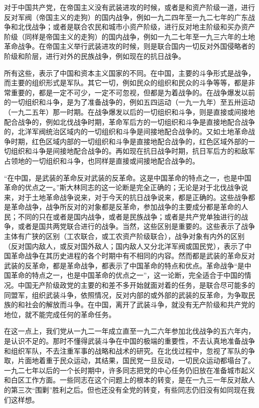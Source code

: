 对于中国共产党，在帝国主义没有武装进攻的时候，或者是和资产阶级一道，进行反对军阀（帝国主义的走狗）的国内战争，例如一九二四年至一九二七年的广东战争和北伐战争；或者是联合农民和城市小资产阶级，进行反对地主阶级和买办资产阶级（同样是帝国主义的走狗）的国内战争，例如一九二七年至一九三六年的土地革命战争。在帝国主义举行武装进攻的时候，则是联合国内一切反对外国侵略者的阶级和阶层，进行对外的民族战争，例如现在的抗日战争。

所有这些，表示了中国和资本主义国家的不同。在中国，主要的斗争形式是战争，而主要的组织形式是军队。其它一切，例如民众的组织和民众的斗争等等，都是非常重要的，都是一定不可少，一定不可忽视，但都是为着战争的。在战争爆发以前的一切组织和斗争，是为了准备战争的，例如五四运动（一九一九年）至五卅运动（一九二五年）那一时期。在战争爆发以后的一切组织和斗争，则是直接或间接地配合战争的，例如北伐战争时期，革命军后方的一切组织和斗争是直接地配合战争的，北洋军阀统治区域内的一切组织和斗争是间接地配合战争的。又如土地革命战争时期，红色区域内部的一切组织和斗争是直接地配合战争的，红色区域外部的一切组织和斗争是间接地配合战争的。再如现在抗日战争时期，抗日军后方的和敌军占领地的一切组织和斗争，也同样是直接或间接地配合战争的。

“在中国，是武装的革命反对武装的反革命。这是中国革命的特点之一，也是中国革命的优点之一。”斯大林同志的这一论断是完全正确的；无论是对于北伐战争说来，对于土地革命战争说来，对于今天的抗日战争说来，都是正确的。这些战争都是革命战争，战争所反对的对象都是反革命，参加战争的主要成分都是革命的人民；不同的只在或者是国内战争，或者是民族战争；或者是共产党单独进行的战争，或者是国共两党联合进行的战争。当然，这些区别是重要的。这些表示了战争主体有广狭的区别（工农联合，或工农资产阶级联合），战争对象有内外的区别（反对国内敌人，或反对国外敌人；国内敌人又分北洋军阀或国民党），表示了中国革命战争在其历史进程的各个时期中有不相同的内容。然而都是武装的革命反对武装的反革命，都是革命战争，都表示了中国革命的特点和优点。革命战争“是中国革命的特点之一，也是中国革命的优点之一”，这一论断，完全适合于中国的情况。中国无产阶级政党的主要的和差不多开始就面对着的任务，是联合尽可能多的同盟军，组织武装斗争，依照情况，反对内部的或外部的武装的反革命，为争取民族的和社会的解放而斗争。在中国，离开了武装斗争，就没有无产阶级和共产党的地位，就不能完成任何的革命任务。

在这一点上，我们党从一九二一年成立直至一九二六年参加北伐战争的五六年内，是认识不足的。那时不懂得武装斗争在中国的极端的重要性，不去认真地准备战争和组织军队，不去注重军事的战略和战术的研究。在北伐过程中，忽视了军队的争取，片面地着重于民众运动，其结果，国民党一旦反动，一切民众运动都塌台了。一九二七年以后的一个长时期中，许多同志把党的中心任务仍旧放在准备城市起义和白区工作方面。一些同志在这个问题上的根本的转变，是在一九三一年反对敌人的第三次“围剿”胜利之后。但也还没有全党的转变，有些同志仍旧没有如同现在我们这样想。

